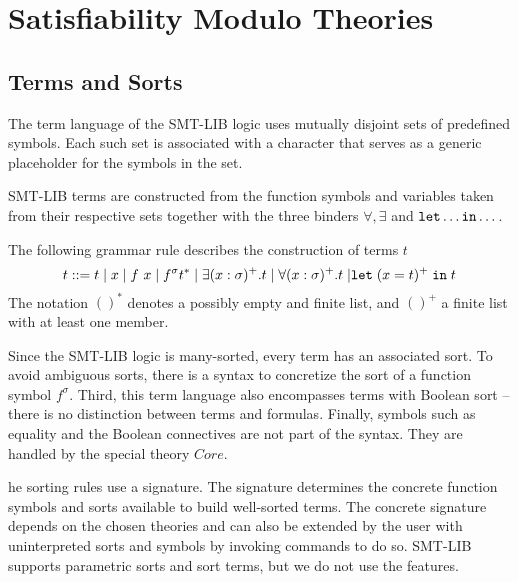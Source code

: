 \chapter{Satisfiability Modulo Theories}\label{ch:smt}


\section{Terms and Sorts}

The term language of the SMT-LIB logic uses mutually disjoint sets of predefined symbols.
Each such set is associated with a character that serves as a generic placeholder for the symbols in the set.




SMT-LIB terms are constructed from the function symbols and variables taken from their respective sets together with the three binders \( \forall, \exists \) and \( \texttt{\upshape{let}} \dots \texttt{\upshape{in}} \dots \).

\begin{definition}[Terms]
The following grammar rule describes the construction of terms $t$
\begin{equation*}
t ::= t \mathrel{|} x \mathrel{|} f~x \mathrel{|} f^\sigma t^* \mathrel{|} \exists (x: \sigma)^+. t \mathrel{|} \forall (x: \sigma)^+. t \mathrel{|} \mathrel{\texttt{\upshape{let}}} (x = t)^+ \mathrel{\texttt{\upshape{in}}} t
\end{equation*}
The notation $()^*$ denotes a possibly empty and finite list, and $()^+$ a finite list with at least one member.
\end{definition}

Since the SMT-LIB logic is many-sorted, every term has an associated sort.
To avoid ambiguous sorts, there is a syntax to concretize the sort of a function symbol $f^\sigma$.
Third, this term language also encompasses terms with Boolean sort – there is no distinction between terms and formulas.
Finally, symbols such as equality and the Boolean connectives are not part of the syntax. They are handled by the special theory $Core$.

he sorting rules use a signature. The signature determines the concrete
function symbols and sorts available to build well-sorted terms. The concrete
signature depends on the chosen theories and can also be extended by the
user with uninterpreted sorts and symbols by invoking commands to do so.
SMT-LIB supports parametric sorts and sort terms, but we do not use the
features.


